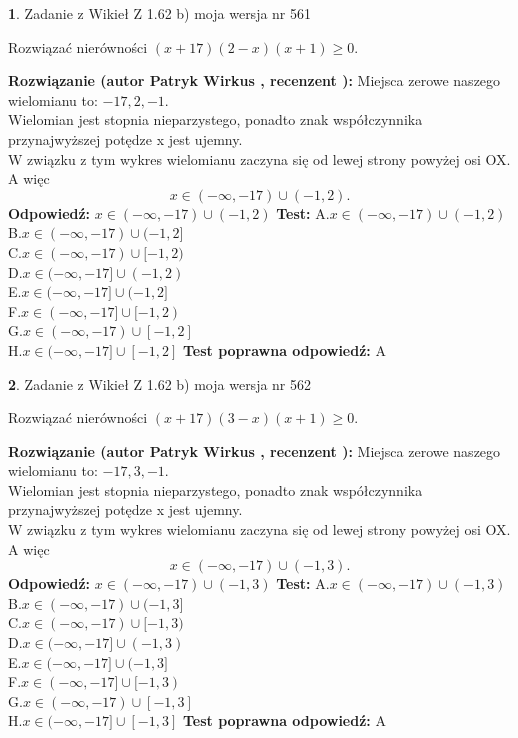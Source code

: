 \documentclass[12pt, a4paper]{article}
\theoremstyle{definition} %
\newtheorem{zad}{}
\newcommand{\zadStart}[1]{\begin{zad}#1\newline}
\newcommand{\zadStop}{\end{zad}}
\newcommand{\rozwStart}[2]{\noindent \textbf{Rozwiązanie (autor #1 , recenzent #2): }\newline}
\newcommand{\rozwStop}{\newline}
\newcommand{\odpStart}{\noindent \textbf{Odpowiedź:}\newline}
\newcommand{\odpStop}{\newline}
\newcommand{\testStart}{\noindent \textbf{Test:}\newline}
\newcommand{\testStop}{\newline}
\newcommand{\kluczStart}{\noindent \textbf{Test poprawna odpowiedź:}\newline}
\newcommand{\kluczStop}{\newline}
\begin{document}
\zadStart{Zadanie z Wikieł Z 1.62 b) moja wersja nr 561}

Rozwiązać nierówności $(x+17)(2-x)(x+1)\ge0$.
\zadStop
\rozwStart{Patryk Wirkus}{}
Miejsca zerowe naszego wielomianu to: $-17, 2, -1$.\\
Wielomian jest stopnia nieparzystego, ponadto znak współczynnika przy\linebreak najwyższej potędze x jest ujemny.\\ W związku z tym wykres wielomianu zaczyna się od lewej strony powyżej osi OX. A więc $$x \in (-\infty,-17) \cup (-1,2).$$
\rozwStop
\odpStart
$x \in (-\infty,-17) \cup (-1,2)$
\odpStop
\testStart
A.$x \in (-\infty,-17) \cup (-1,2)$\\
B.$x \in (-\infty,-17) \cup (-1,2]$\\
C.$x \in (-\infty,-17) \cup [-1,2)$\\
D.$x \in (-\infty,-17] \cup (-1,2)$\\
E.$x \in (-\infty,-17] \cup (-1,2]$\\
F.$x \in (-\infty,-17] \cup [-1,2)$\\
G.$x \in (-\infty,-17) \cup [-1,2]$\\
H.$x \in (-\infty,-17] \cup [-1,2]$
\testStop
\kluczStart
A
\kluczStop



\zadStart{Zadanie z Wikieł Z 1.62 b) moja wersja nr 562}

Rozwiązać nierówności $(x+17)(3-x)(x+1)\ge0$.
\zadStop
\rozwStart{Patryk Wirkus}{}
Miejsca zerowe naszego wielomianu to: $-17, 3, -1$.\\
Wielomian jest stopnia nieparzystego, ponadto znak współczynnika przy\linebreak najwyższej potędze x jest ujemny.\\ W związku z tym wykres wielomianu zaczyna się od lewej strony powyżej osi OX. A więc $$x \in (-\infty,-17) \cup (-1,3).$$
\rozwStop
\odpStart
$x \in (-\infty,-17) \cup (-1,3)$
\odpStop
\testStart
A.$x \in (-\infty,-17) \cup (-1,3)$\\
B.$x \in (-\infty,-17) \cup (-1,3]$\\
C.$x \in (-\infty,-17) \cup [-1,3)$\\
D.$x \in (-\infty,-17] \cup (-1,3)$\\
E.$x \in (-\infty,-17] \cup (-1,3]$\\
F.$x \in (-\infty,-17] \cup [-1,3)$\\
G.$x \in (-\infty,-17) \cup [-1,3]$\\
H.$x \in (-\infty,-17] \cup [-1,3]$
\testStop
\kluczStart
A
\kluczStop
\end{document}
